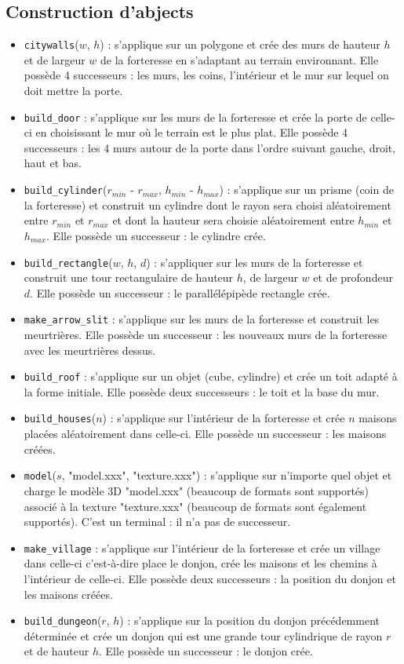 \documentclass[a4paper,11pt]{article}
\begin{document}
\subsection{Construction d'abjects}
\begin{itemize}
    \item \texttt{citywalls}($ w $, $ h $) : s'applique sur un polygone et crée des murs de hauteur $ h $ et de largeur $ w $ de la forteresse en s'adaptant au terrain environnant. Elle possède 4 successeurs : les murs, les coins, l'intérieur et le mur sur lequel on doit mettre la porte.
    \item \texttt{build\_door} : s'applique sur les murs de la forteresse et crée la porte de celle-ci en choisissant le mur où le terrain est le plus plat. Elle possède 4 successeurs : les 4 murs autour de la porte dans l'ordre suivant gauche, droit, haut et bas.
    \item \texttt{build\_cylinder}($ r_{min} $ - $ r_{max} $, $ h_{min} $ - $ h_{max} $) : s'applique sur un prisme (coin de la forteresse) et construit un cylindre dont le rayon sera choisi aléatoirement entre $ r_{min} $ et $ r_{max} $ et dont la hauteur sera choisie aléatoirement entre $ h_{min} $ et $ h_{max} $. Elle possède un successeur : le cylindre crée.
    \item \texttt{build\_rectangle}($ w $, $ h $, $ d $) : s'appliquer sur les murs de la forteresse et construit une tour rectangulaire de hauteur $ h $, de largeur $ w $ et de profondeur $ d $. Elle possède un successeur : le parallélépipède rectangle crée.
    \item \texttt{make\_arrow\_slit} : s'applique sur les murs de la forteresse et construit les meurtrières. Elle possède un successeur : les \og nouveaux \fg murs de la forteresse avec les meurtrières dessus.
    \item \texttt{build\_roof} : s'applique sur un objet (cube, cylindre) et crée un toit adapté à la forme initiale. Elle possède deux successeurs : le toit et la base du mur.
    \item \texttt{build\_houses}($ n $) : s'applique sur l'intérieur de la forteresse et crée $ n $ maisons placées aléatoirement dans celle-ci. Elle possède un successeur : les maisons créées.
    \item \texttt{model}($ s $, "model.xxx", "texture.xxx") : s'applique sur n'importe quel objet et charge le modèle 3D "model.xxx" (beaucoup de formats sont supportés) associé à la texture "texture.xxx" (beaucoup de formats sont également supportés). C'est un terminal : il n'a pas de successeur.
    \item \texttt{make\_village} : s'applique sur l'intérieur de la forteresse et crée un village dans celle-ci c'est-à-dire place le donjon, crée les maisons et les chemins à l'intérieur de celle-ci. Elle possède deux successeurs : la position du donjon et les maisons créées.
    \item \texttt{build\_dungeon}($ r $, $ h $) : s'applique sur la position du donjon précédemment déterminée et crée un donjon qui est une grande tour cylindrique de rayon $ r $ et de hauteur $ h $. Elle possède un successeur : le donjon crée.
\end{itemize}
\end{document}
